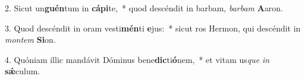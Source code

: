 2. Sicut un\textbf{guén}tum in \textbf{cá}\textbf{pi}te,~*  quod descéndit in barbam, \textit{bar}\textit{bam} \textbf{A}aron.\

3. Quod descéndit in oram vesti\textbf{mén}ti \textbf{e}jus:~*  sicut ros Hermon, qui descéndit in \textit{mon}\textit{tem} \textbf{Si}on.\

4. Quóniam illic mandávit Dóminus bene\textbf{dic}ti\textbf{ó}nem,~*  et vitam us\textit{que} \textit{in} \textbf{sǽ}culum.\

